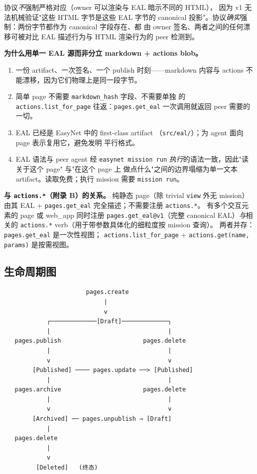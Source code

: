 \documentclass[11pt,a4paper]{article}
\theoremstyle{definition}
\begin{document}
协议\emph{不}强制严格对应（owner 可以渲染与 EAL 暗示不同的 HTML），
因为 v1 无法机械验证"这些 HTML 字节是这些 EAL 字节的 canonical
投影"。协议\emph{确实}强制：两份字节都作为 canonical 字段存在、都
由 owner 签名、两者之间的任何漂移可被对比 EAL 描述行为与 HTML
渲染行为的 peer 检测到。

\textbf{为什么用单一 EAL 源而非分立 markdown + actions blob。}

\begin{enumerate}[leftmargin=2em,itemsep=0.15em]
    \item 一份 artifact、一次签名、一个 publish 时刻——markdown
    内容与 actions 不能漂移，因为它们物理上是同一段字节。
    \item 简单 page 不需要 \texttt{markdown\_hash} 字段、不需要单独
    的 \texttt{actions.list\_for\_page} 往返：\texttt{pages.get\_eal}
    一次调用就返回 peer 需要的一切。
    \item EAL 已经是 EasyNet 中的 first-class artifact
    （\texttt{src/eal/}）；为 agent 面向 page 表示复用它，避免发明
    平行格式。
    \item EAL 语法与 peer agent 经 \texttt{easynet mission run}
    \emph{执行}的语法一致，因此"读关于这个 page" 与"在这个 page 上
    做点什么"之间的边界塌缩为单一文本 artifact。读取免费；执行 mission
    需要 \texttt{mission run}。
\end{enumerate}

\textbf{与 \texttt{actions.*}（附录 B）的关系。} 纯静态 page（除
trivial \texttt{view} 外无 mission）由其 EAL +
\texttt{pages.get\_eal} 完全描述；不需要注册 \texttt{actions.*}。
有多个交互元素的 page 或 web\_app 同时注册
\texttt{pages.get\_eal@v1}（完整 canonical EAL）\emph{与}相关的
\texttt{actions.*} verb（用于带参数具体化的细粒度按 mission 查询）。
两者并存：\texttt{pages.get\_eal} 是一次性视图；
\texttt{actions.list\_for\_page} + \texttt{actions.get(name, params)}
是按需视图。

\subsection{生命周期图}

\begin{lstlisting}
                       pages.create
                            |
                            v
            ┌─────────────[Draft]─────────────┐
            |                                 |
   pages.publish                       pages.delete
            |                                 |
            v                                 v
        [Published] ──── pages.update ──> [Published]
            |                                 |
   pages.archive                       pages.delete
            |                                 |
            v                                 v
        [Archived] ── pages.unpublish → [Draft]
            |
   pages.delete
            |
            v
         [Deleted]   (终态)
\end{lstlisting}
\end{document}
